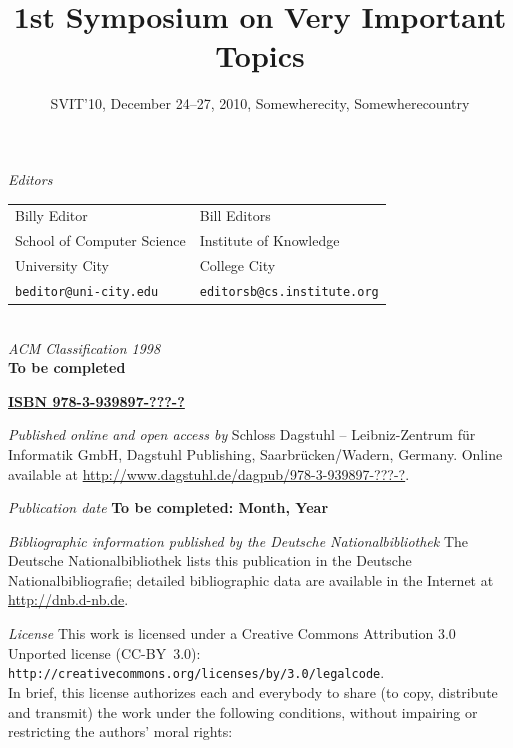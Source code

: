 \documentclass[a4paper,UKenglish]{oasicsmaster}
\title{\huge 1st Symposium on Very Important Topics}
\subtitle{SVIT'10, December 24--27, 2010, Somewherecity, Somewherecountry}
\begin{document}
\frontmatter

\maketitle

\begin{publicationinfo}%
\sffamily

\emph{Editors} \\[0.2cm]
\begin{tabular}{ll}
Billy Editor              &   Bill Editors   \\
School of Computer Science   &  Institute of Knowledge \\ 
University City & College City \\ 
\texttt{beditor@uni-city.edu} &  \texttt{editorsb@cs.institute.org}
\end{tabular}
\ \\

\bigskip
\bigskip
\bigskip
\bigskip
\emph{ACM Classification 1998}\\
\textbf{To be completed}

\bigskip
\bigskip

{\Large\bf\sffamily \href{http://www.dagstuhl.de/dagpub/978-3-939897-???-?}{ISBN 978-3-939897-???-?}}

\bigskip
\bigskip

\emph{Published online and open access by}\newline
Schloss Dagstuhl -- Leibniz-Zentrum f\"ur Informatik GmbH, Dagstuhl Publishing, Saarbr\"ucken/Wadern, Germany. Online available at \href{http://www.dagstuhl.de/dagpub/978-3-939897-???-?}{http://www.dagstuhl.de/dagpub/978-3-939897-???-?}.

\bigskip
\emph{Publication date}\newline
\textbf{To be completed: Month, Year}

\bigskip
\bigskip

\emph{Bibliographic information published by the Deutsche Nationalbibliothek}\newline
The Deutsche Nationalbibliothek lists this publication in the Deutsche Nationalbibliografie; detailed bibliographic data are available in the Internet at \href{http://dnb.d-nb.de}{http://dnb.d-nb.de}. 

\bigskip

\emph{License}\newline
This work is licensed under a Creative Commons Attribution 3.0 Unported license (CC-BY~3.0): \texttt{http://creativecommons.org/licenses/by/3.0/legalcode}.\\
In brief, this license authorizes each and everybody to share (to copy, distribute and transmit) the work under the following conditions, without impairing or restricting the authors' moral rights:


\end{publicationinfo}
\end{document}
